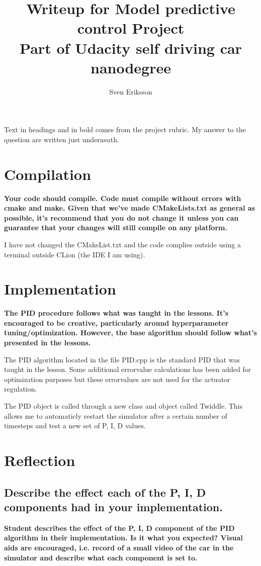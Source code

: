 \documentclass[12pt,a4paper]{article}
\author{Sven Eriksson}
\title{Writeup for Model predictive control Project \\ \large{Part of Udacity self driving car nanodegree}}
\begin{document}
\maketitle


Text in headings and in bold comes from the project rubric. My answer to the question are written just underneath.

\section{Compilation}
\textbf{Your code should compile. Code must compile without errors with cmake and make. Given that we've made CMakeLists.txt as general as possible, it's recommend that you do not change it unless you can guarantee that your changes will still compile on any platform. }

I have not changed the CMakeList.txt and the code complies outside using a terminal outside CLion (the IDE I am using).

\section{Implementation}
\textbf{The PID procedure follows what was taught in the lessons. It's encouraged to be creative, particularly around hyperparameter tuning/optimization. However, the base algorithm should follow what's presented in the lessons.}

The PID algorithm located in the file PID.cpp is the standard PID that was taught in the lesson. Some additional errorvalue calculations has been added for optimization purposes but these errorvalues are not used for the actuator regulation.

The PID object is called through a new class and object called Twiddle. This allows me to automaticly restart the simulator after a certain number of timesteps and test a new set of P, I, D values.

\section{Reflection}
\subsection{Describe the effect each of the P, I, D components had in your implementation.}
\textbf{Student describes the effect of the P, I, D component of the PID algorithm in their implementation. Is it what you expected? Visual aids are encouraged, i.e. record of a small video of the car in the simulator and describe what each component is set to. }
\end{document}
